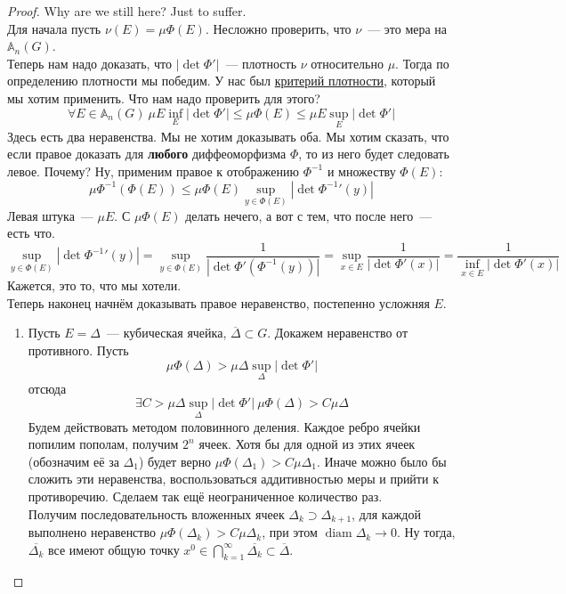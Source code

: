 \documentclass{article}
\begin{document}
    \begin{proof}
        Why are we still here? Just to suffer.\\
        Для начала пусть $\nu(E)=\mu\Phi(E)$. Несложно проверить, что $\nu$~--- это мера на $\mathbb A_n(G)$.\\
        Теперь нам надо доказать, что $|\det\Phi'|$~--- плотность $\nu$  относительно $\mu$. Тогда по определению плотности мы победим. У нас был \hyperref[Критерий плотности]{критерий плотности}, который мы хотим применить. Что нам надо проверить для этого?
        $$
        \forall E\in\mathbb A_n(G)~\mu E\inf\limits_E|\det\Phi'|\leqslant\mu\Phi(E)\leqslant\mu E\sup\limits_E|\det\Phi'|
        $$
        Здесь есть два неравенства. Мы не хотим доказывать оба. Мы хотим сказать, что если правое доказать для \textbf{любого} диффеоморфизма $\Phi$, то из него будет следовать левое. Почему? Ну, применим правое к отображению $\Phi^{-1}$ и множеству $\Phi(E)$:
        $$
        \mu\Phi^{-1}(\Phi(E))\leqslant\mu\Phi(E)\sup\limits_{y\in\Phi(E)}|\det{\Phi^{-1}}'(y)|
        $$
        Левая штука~--- $\mu E$. С $\mu\Phi(E)$ делать нечего, а вот с тем, что после него~--- есть что.
        $$
        \sup\limits_{y\in\Phi(E)}|\det{\Phi^{-1}}'(y)|=\sup\limits_{y\in\Phi(E)}\frac1{|\det \Phi'(\Phi^{-1}(y))|}=\sup\limits_{x\in E}\frac1{|\det\Phi'(x)|}=\frac1{\inf\limits_{x\in E}|\det\Phi'(x)|}
        $$
        Кажется, это то, что мы хотели.\\
        Теперь наконец начнём доказывать правое неравенство, постепенно усложняя $E$.
        \begin{enumerate}
            \item Пусть $E=\Delta$~--- кубическая ячейка, $\overline\Delta\subset G$. Докажем неравенство от противного. Пусть
            $$
            \mu\Phi(\Delta)>\mu\Delta\sup\limits_\Delta|\det\Phi'|
            $$
            отсюда
            $$\exists C>\mu\Delta\sup\limits_\Delta|\det\Phi'|~\mu\Phi(\Delta)>C\mu\Delta$$
            Будем действовать методом половинного деления. Каждое ребро ячейки попилим пополам, получим $2^n$ ячеек. Хотя бы для одной из этих ячеек (обозначим её за $\Delta_1$) будет верно $\mu\Phi(\Delta_1)>C\mu\Delta_1$. Иначе можно было бы сложить эти неравенства, воспользоваться аддитивностью меры и прийти к противоречию. Сделаем так ещё неограниченное количество раз.\\
            Получим последовательность вложенных ячеек $\Delta_k\supset\Delta_{k+1}$, для каждой выполнено неравенство $\mu\Phi(\Delta_k)>C\mu\Delta_k$, при этом $\operatorname{diam}\Delta_k\to0$. Ну тогда, $\overline{\Delta_k}$ все имеют общую точку $x^0\in\bigcap\limits_{k=1}^\infty\overline{\Delta_k}\subset\overline{\Delta}$.\\

\end{enumerate}
\end{proof}
\end{document}
